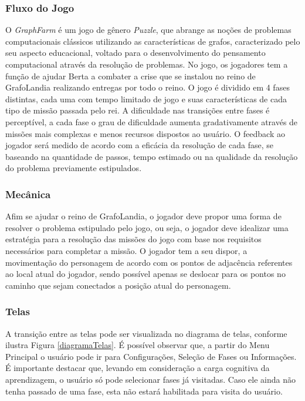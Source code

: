 \documentclass[10pt, conference, compsocconf]{IEEEtran}
\begin{document}
\subsubsection{Fluxo do Jogo}
O \textit{GraphFarm} é um jogo de gênero \textit{Puzzle}, que abrange as noções de problemas computacionais clássicos utilizando as características de grafos, caracterizado pelo seu aspecto educacional, voltado para o desenvolvimento do pensamento computacional através da resolução de problemas. No jogo, os jogadores tem a função de ajudar Berta a combater a crise que se instalou no reino de GrafoLandia realizando entregas por todo o reino. O jogo é dividido em 4 fases distintas, cada uma com tempo limitado de jogo e suas características de cada tipo de missão passada pelo rei. A dificuldade nas transições entre fases é perceptível, a cada fase o grau de dificuldade aumenta gradativamente através de missões mais complexas e menos recursos dispostos ao usuário. O feedback ao jogador será medido de acordo com a eficácia da resolução de cada fase, se baseando na quantidade de passos, tempo estimado ou na qualidade da resolução do problema previamente estipulados.

\subsubsection{Mecânica}
Afim se ajudar o reino de GrafoLandia, o jogador deve propor uma forma de resolver o problema estipulado pelo jogo, ou seja, o jogador deve idealizar uma estratégia para a resolução das missões do jogo com base nos requisitos necessários para completar a missão. O jogador tem a seu dispor, a movimentação do personagem de acordo com os pontos de adjacência referentes ao local atual do jogador, sendo possível apenas se deslocar para os pontos no caminho que sejam conectados a posição atual do personagem. 


\subsubsection{Telas}\label{GDD}
A transição entre as telas pode ser visualizada no diagrama de telas, conforme ilustra Figura \ref{diagramaTelas}. É possível observar que, a partir do Menu Principal o usuário pode ir para Configurações, Seleção de Fases ou Informações. É importante destacar que, levando em consideração a carga cognitiva da aprendizagem, o usuário só pode selecionar fases já visitadas. Caso ele ainda não tenha passado de uma fase, esta não estará habilitada para visita do usuário.
\end{document}
